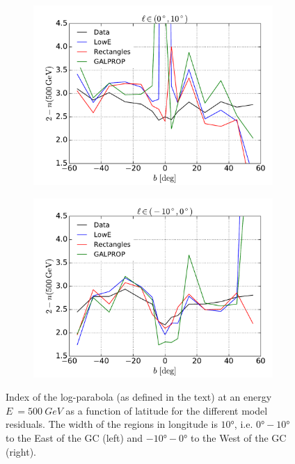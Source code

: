 \begin{figure}[h!]
    \begin{subfigure}{0.5\textwidth}
        \includegraphics[width=\textwidth]{plots/LogParabola_n(500GeV)_l_in_(0,10).pdf}
    \end{subfigure} 
    \begin{subfigure}{0.5\textwidth}
        \includegraphics[width=\textwidth]{plots/LogParabola_n(500GeV)_l_in_(-10,0).pdf}
    \end{subfigure}
  	\caption{Index of the log-parabola (as defined in the text) at an energy $E\ = \SI{500}{GeV}$ as a function of latitude for the different model residuals. The width of the regions in longitude is $\ang{10}$, i.e. $\ang{0} - \ang{10}$ to the East of the GC (left) and $\ang{-10} - \ang{0}$ to the West of the GC (right).}
  	\label{fig:logpar_index}
\end{figure}





